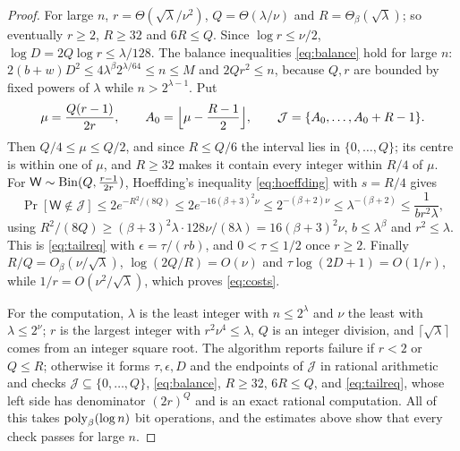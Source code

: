 \begin{proof}
For large $n$, $r=\Theta(\sqrt\lambda/\nu^2)$, $Q=\Theta(\lambda/\nu)$ and
$R=\Theta_\beta(\sqrt\lambda)$; so eventually $r\ge2$, $R\ge32$ and $6R\le Q$.
Since $\log r\le\nu/2$, $\log D=2Q\log r\le\lambda/128$. The balance inequalities
\eqref{eq:balance} hold for large $n$: $2(b+w)D^2\le4\lambda^\beta2^{\lambda/64}\le n\le M$
and $2Qr^2\le n$, because $Q,r$ are bounded by fixed powers of $\lambda$ while
$n>2^{\lambda-1}$. Put
\[
  \mu=\frac{Q(r-1)}{2r},\qquad A_0=\Bigl\lfloor\mu-\frac{R-1}2\Bigr\rfloor,\qquad
  \mathcal J=\{A_0,\dots,A_0+R-1\}.
\]
Then $Q/4\le\mu\le Q/2$, and since $R\le Q/6$ the interval lies in
$\{0,\dots,Q\}$; its centre is within one of $\mu$, and $R\ge32$ makes it contain
every integer within $R/4$ of $\mu$. For $\mathsf W\sim\operatorname{Bin}(Q,\frac{r-1}{2r})$,
Hoeffding's inequality \eqref{eq:hoeffding} with $s=R/4$ gives
\[
  \Pr[\mathsf W\notin\mathcal J]\le2e^{-R^2/(8Q)}\le2e^{-16(\beta+3)^2\nu}
  \le2^{-(\beta+2)\nu}\le\lambda^{-(\beta+2)}\le\frac1{br^2\lambda},
\]
using $R^2/(8Q)\ge(\beta+3)^2\lambda\cdot128\nu/(8\lambda)=16(\beta+3)^2\nu$,
$b\le\lambda^\beta$ and $r^2\le\lambda$. This is \eqref{eq:tailreq} with
$\epsilon=\tau/(rb)$, and $0<\tau\le1/2$ once $r\ge2$. Finally
$R/Q=O_\beta(\nu/\sqrt\lambda)$, $\log(2Q/R)=O(\nu)$ and
$\tau\log(2D+1)=O(1/r)$, while $1/r=O(\nu^2/\sqrt\lambda)$, which proves
\eqref{eq:costs}.

For the computation, $\lambda$ is the least integer with $n\le2^\lambda$ and $\nu$
the least with $\lambda\le2^\nu$; $r$ is the largest integer with
$r^2\nu^4\le\lambda$, $Q$ is an integer division, and $\lceil\sqrt\lambda\rceil$
comes from an integer square root. The algorithm reports failure if $r<2$ or
$Q\le R$; otherwise it forms $\tau,\epsilon,D$ and the endpoints of $\mathcal J$
in rational arithmetic and checks $\mathcal J\subseteq\{0,\dots,Q\}$,
\eqref{eq:balance}, $R\ge32$, $6R\le Q$, and \eqref{eq:tailreq}, whose left side
has denominator $(2r)^Q$ and is an exact rational computation. All of this takes
$\operatorname{poly}_\beta(\log n)$ bit operations, and the estimates above show that every check
passes for large $n$.
\end{proof}
